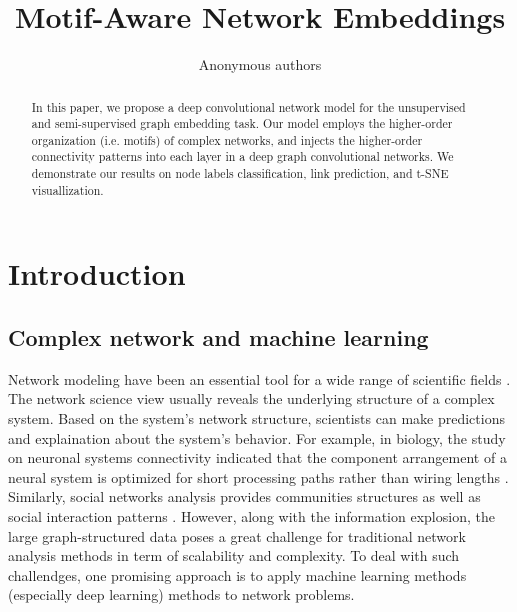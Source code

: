 \documentclass{article}
\title{Motif-Aware Network Embeddings}
\author{Anonymous authors}
\theoremstyle{definition}
\begin{document}
\maketitle

\begin{abstract}
  In this paper, we propose a deep convolutional network model for
  the unsupervised and semi-supervised graph embedding task. Our 
  model employs the higher-order organization (i.e. motifs) 
  of complex networks, and injects the higher-order connectivity 
  patterns into each layer in a deep graph convolutional networks. 
  We demonstrate our results on node labels classification, link 
  prediction, and t-SNE visuallization.
\end{abstract}

\section{Introduction}

\subsection{Complex network and machine learning}

Network modeling have been an essential tool for a wide
range of scientific fields \cite{physicnet,molecule,youtube,motifblockmilo,juremotif}.
The network science view usually reveals the underlying structure 
of a complex system. Based on the system's network structure, 
scientists can make predictions and explaination
about the system's behavior. For example, in biology, the
study on neuronal systems connectivity indicated
that the component arrangement of a neural system is optimized
for short processing paths rather than wiring lengths \cite{kaiser2006nonoptimal}. 
Similarly, social networks analysis provides communities structures
as well as social interaction patterns \cite{west2014exploiting,barabasi2014network}. 
However, along with the information explosion, the large graph-structured
data poses a great challenge for traditional network analysis methods
in term of scalability and complexity. To deal with such challendges,
one promising approach is to apply machine learning methods (especially
deep learning) methods to network problems.
\end{document}
